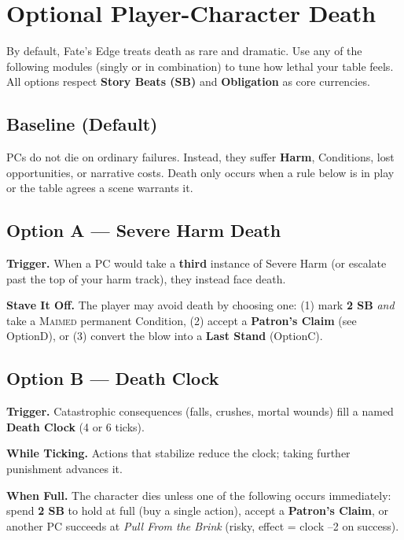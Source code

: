 
\section{Optional Player-Character Death}\label{sec:pc-death-optional}

By default, Fate’s Edge treats death as rare and dramatic. Use any of the following modules (singly or in combination) to tune how lethal your table feels. All options respect \textbf{Story Beats (SB)} and \textbf{Obligation} as core currencies.

\subsection*{Baseline (Default)}\label{subsec:death-baseline}
PCs do not die on ordinary failures. Instead, they suffer \textbf{Harm}, Conditions, lost opportunities, or narrative costs. Death only occurs when a rule below is in play or the table agrees a scene warrants it.

\subsection*{Option A — Severe Harm Death}\label{subsec:death-severe}
\textbf{Trigger.} When a PC would take a \textbf{third} instance of Severe Harm (or escalate past the top of your harm track), they instead face death.\par
\textbf{Stave It Off.} The player may avoid death by choosing one: (1) mark \textbf{2 SB} \emph{and} take a \textsc{Maimed} permanent Condition, (2) accept a \textbf{Patron’s Claim} (see OptionD), or (3) convert the blow into a \textbf{Last Stand} (OptionC).

\subsection*{Option B — Death Clock}\label{subsec:death-clock}
\textbf{Trigger.} Catastrophic consequences (falls, crushes, mortal wounds) fill a named \textbf{Death Clock} (4 or 6 ticks).\par
\textbf{While Ticking.} Actions that stabilize reduce the clock; taking further punishment advances it.\par
\textbf{When Full.} The character dies unless one of the following occurs immediately: spend \textbf{2 SB} to hold at full (buy a single action), accept a \textbf{Patron’s Claim}, or another PC succeeds at \emph{Pull From the Brink} (risky, effect = clock –2 on success).

